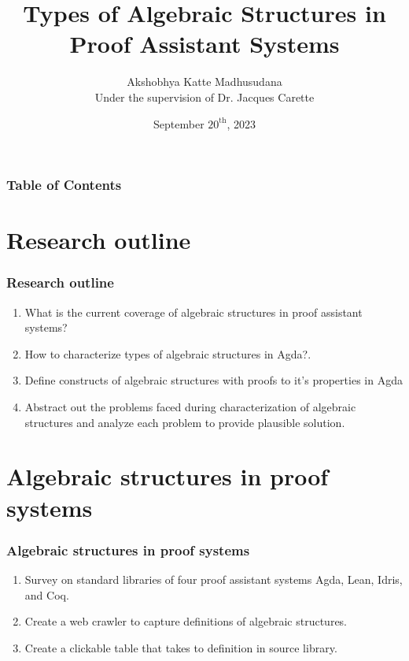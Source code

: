 \documentclass[xcolor={dvipsnames}]{beamer}
\title[Algebra in Proof Systems]{Types of Algebraic Structures in Proof Assistant Systems}
\author[Akshobhya K M]{Akshobhya Katte Madhusudana\\\small{}Under the supervision of Dr. Jacques Carette}
\institute[McMaster University]{McMaster University}
\date{September $20^{\text{th}}$, 2023}
\begin{document}
\frame{\titlepage}


\begin{frame}
\frametitle{Table of Contents}
\tableofcontents
\end{frame}

\section{Research outline}

\begin{frame}
  \frametitle{Research outline}

  \begin{enumerate}
    \item What is the current coverage of algebraic structures in proof assistant systems?
    \item How to characterize types of algebraic structures in Agda?. 
    \item Define constructs of algebraic structures with proofs to it's properties in Agda
    \item Abstract out the problems faced during characterization of algebraic structures and analyze each problem to provide plausible solution.    
  \end{enumerate}
\end{frame}

\section{Algebraic structures in proof systems}

\begin{frame}
  \frametitle{Algebraic structures in proof systems}
  \begin{enumerate}
    \item Survey on standard libraries of four proof assistant systems Agda, Lean, Idris, and Coq.
    \item Create a web crawler to capture definitions of algebraic structures.
    \item Create a clickable table that takes to definition in source library.
  \end{enumerate}

\end{frame}
\end{document}
